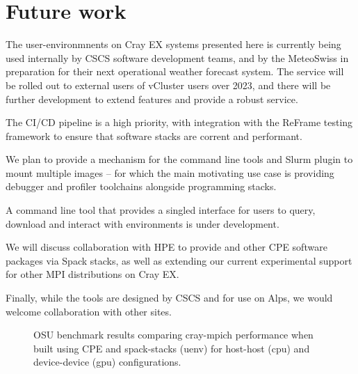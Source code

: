 \section{Future work}

The user-environmnents on Cray EX systems presented here is currently being used internally by CSCS software development teams, and by the MeteoSwiss in preparation for their next operational weather forecast system.
The service will be rolled out to external users of vCluster users over 2023, and there will be further development to extend features and provide a robust service.

\vfill\eject

The CI/CD pipeline is a high priority, with integration with the ReFrame testing framework to ensure that software stacks are corrent and performant.

We plan to provide a mechanism for the command line tools and Slurm plugin to mount multiple images -- for which the main motivating use case is providing debugger and profiler toolchains alongside programming stacks.

A command line tool that provides a singled interface for users to query, download and interact with environments is under development.

We will discuss collaboration with HPE to provide \craympich and other CPE software packages via Spack stacks, as well as extending our current experimental support for other MPI distributions on Cray EX.

Finally, while the tools are designed by CSCS and for use on Alps, we would welcome collaboration with other sites.


%        

\begin{figure}[htp!]
    \begin{center}
        
        \hfill
        \newline
        
        \hfill
        \newline
        
        \hfill
        \newline
    \end{center}
    \caption{OSU benchmark results comparing cray-mpich performance when built using CPE and spack-stacks (uenv) for host-host (cpu) and device-device (gpu) configurations.}
    \label{fig:osu}
\end{figure}

